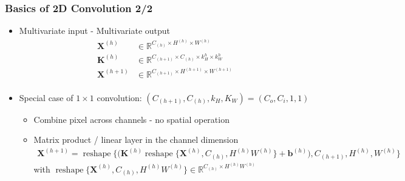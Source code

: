 \documentclass[pressentation,10pt,aspectratio=169,xcolor=table, colorlinks=true]{beamer}
\DeclareMathOperator{\reshape}{reshape}
\begin{document}
\begin{frame}
  \frametitle{Basics of 2D Convolution 2/2}
  \begin{itemize}
  \item Multivariate input - Multivariate output
    \begin{align*}
      \mathbf{X}^{(h)} & \in {} \mathbb{R}^{C_{(h)} \times H^{(h)} \times W^{(h)}}\\
      \mathbf{K}^{(h)} & \in {} \mathbb{R}^{C_{(h+1)}\times C_{(h)} \times k_{H}^h \times k_{W}^h}\\
      \mathbf{X}^{(h+1)}& \in {} \mathbb{R}^{C_{(h+1)} \times H^{(h+1)} \times W^{(h+1)}}\\
    \end{align*}
  \item Special case of \(1\times 1\) convolution: \((C_{(h+1)}, C_{(h)}, k_H, K_W) = (C_o, C_i,1,1)\)
    \begin{itemize}
      \item Combine pixel across channels - no spatial operation
      \item Matrix product / linear layer in the channel dimension
    \begin{align*}
      \mathbf{X}^{(h+1)} = \reshape\bigg\{\big(\mathbf{K}^{(h)}\reshape\big\{\mathbf{X}^{(h)}, C_{(h)}, H^{(h)}W^{(h)}\big\}+\mathbf{b}^{(h)}\big), C_{(h+1)}, H^{(h)},W^{(h)}\bigg\}
    \end{align*}
    with \(\reshape\big\{\mathbf{X}^{(h)}, C_{(h)}, H^{(h)}W^{(h)}\big\}\in\mathbb{R}^{C_{(h)}\times H^{(h)}W^{(h)}}\)
      
    \end{itemize}
  \end{itemize}
\end{frame}
\end{document}
